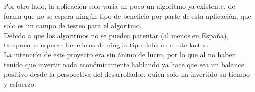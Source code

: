 \quad Por otro lado, la aplicación solo varía un poco un algoritmo ya existente, de forma que no se espera ningún tipo de beneficio por parte de esta aplicación, que solo es un campo de testeo para el algoritmo. \\

\quad Debido a que los algoritmos no se pueden patentar (al menos en España), tampoco se esperan beneficios de ningún tipo debidos a este factor.\\

\quad La intención de este proyecto era sin ánimo de lucro, por lo que al no haber tenido que invertir nada económicamente hablando ya hace que sea un balance positivo desde la perspectiva del desarrollador, quien solo ha invertido su tiempo y esfuerzo.\\ 

\newpage




